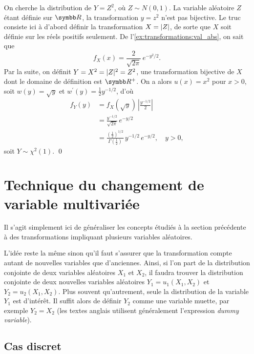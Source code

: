 \begin{exemple}
  On cherche la distribution de $Y = Z^2$, où $Z \sim
  N(0, 1)$. La variable aléatoire $Z$ étant définie sur
  $\R$, la transformation $y = z^2$ n'est pas bijective. Le truc
  consiste ici à d'abord définir la transformation $X = \lvert Z \rvert$, de
  sorte que $X$ soit définie sur les réels positifs seulement. De
  l'\autoref{ex:transformations:val_abs}, on sait que
  \begin{displaymath}
    f_X(x) = \frac{2}{\sqrt{2\pi}}\, e^{-y^2/2}.
  \end{displaymath}
  Par la suite, on définit $Y = X^2 = \lvert Z \rvert^2 = Z^2$, une
  transformation bijective de $X$ dont le domaine de définition est
  $\R^+$. On a alors $u(x) = x^2$ pour $x > 0$, soit $w(y) = \sqrt{y}$
  et $w^\prime(y) = \frac{1}{2} y^{-1/2}$, d'où
  \begin{align*}
    f_Y(y)
    &= f_X(\sqrt{y})\,
    \left|
      \frac{y^{-1/2}}{2}
    \right| \\
    &= \frac{y^{-1/2}}{\sqrt{2\pi}}\, e^{-y/2} \\
    &= \frac{(\frac{1}{2})^{1/2}}{\Gamma(\frac{1}{2})}\, y^{-1/2}\,
    e^{-y/2}, \quad y > 0,
  \end{align*}
  soit $Y \sim \chi^2(1)$.
  \qed
\end{exemple}


\section{Technique du changement de variable multivariée}

Il s'agit simplement ici de généraliser les concepts étudiés à la
section précédente à des transformations impliquant plusieurs
variables aléatoires.

L'idée reste la même sinon qu'il faut s'assurer que la transformation
compte autant de nouvelles variables que d'anciennes. Ainsi, si
l'on part de la distribution conjointe de deux variables aléatoires
$X_1$ et $X_2$, il faudra trouver la distribution conjointe de deux
nouvelles variables aléatoires $Y_1 = u_1(X_1, X_2)$ et $Y_2 =
u_2(X_1, X_2)$. Plus souvent qu'autrement, seule la distribution de la
variable $Y_1$ est d'intérêt. Il suffit alors de définir $Y_2$ comme
une variable muette, par exemple $Y_2 = X_2$ (les textes anglais
utilisent généralement l'expression \emph{dummy variable}).

\subsection{Cas discret}

